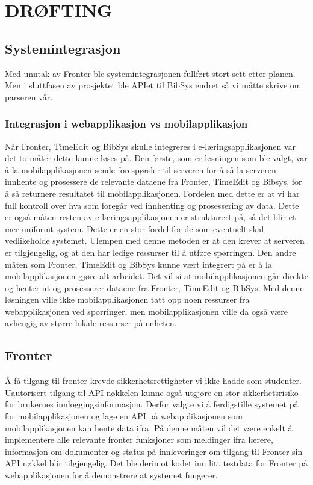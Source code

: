 \documentclass[../main.tex]{subfiles}
\begin{document}
\section{DR{\O}FTING}

\subsection{Systemintegrasjon}
Med unntak av Fronter ble systemintegrasjonen fullført stort sett etter planen. Men i sluttfasen av prosjektet ble APIet til BibSys endret så vi måtte skrive om parseren vår.

\subsubsection{Integrasjon i webapplikasjon vs mobilapplikasjon}
Når Fronter, TimeEdit og BibSys skulle integreres i e-læringsapplikasjonen var det to måter dette kunne løses på. Den første, som er løsningen som ble valgt, var å la mobilapplikasjonen sende forespørsler til serveren for å så la serveren innhente og prosessere de relevante dataene fra Fronter, TimeEdit og Bibsys, for å så returnere resultatet til mobilapplikasjonen. Fordelen med dette er at vi har full kontroll over hva som foregår ved innhenting og prosessering av data. Dette er også måten resten av e-læringsapplikasjonen er strukturert på, så det blir et mer uniformt system. Dette er en stor fordel for de som eventuelt skal vedlikeholde systemet. Ulempen med denne metoden er at den krever at serveren er tilgjengelig, og at den har ledige ressurser til å utføre spørringen.\newline
Den andre måten som Fronter, TimeEdit og BibSys kunne vært integrert på er å la mobilapplikasjonen gjøre alt arbeidet. Det vil si at mobilapplikasjonen går direkte og henter ut og prosesserer dataene fra Fronter, TimeEdit og BibSys. Med denne løsningen ville ikke mobilapplikasjonen tatt opp noen ressurser fra webapplikasjonen ved spørringer, men mobilapplikasjonen ville da også være avhengig av større lokale ressurser på enheten.

\subsection{Fronter}

Å få tilgang til fronter krevde sikkerhetsrettigheter vi ikke hadde som studenter. Uautorisert tilgang til API nøkkelen kunne også utgjøre en stor sikkerhetsrisiko for brukernes innloggingsinformasjon. Derfor valgte vi å ferdigstille systemet på for mobilapplikasjonen og lage en API på webapplikasjonen som mobilapplikasjonen kan hente data ifra. På denne måten vil det være enkelt å implementere alle relevante fronter funksjoner som meldinger ifra lærere, informasjon om dokumenter og status på innleveringer om tilgang til Fronter sin API nøkkel blir tilgjengelig. Det ble derimot kodet inn litt testdata for Fronter på webapplikasjonen for å demonstrere at systemet fungerer.
\end{document}
